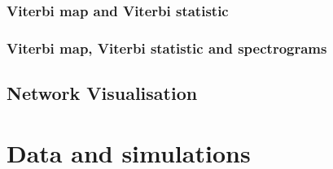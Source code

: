 \subsubsection{Viterbi map and Viterbi statistic}

\subsubsection{Viterbi map, Viterbi statistic and spectrograms}

\subsection{Network Visualisation}


\section{Data and simulations}
